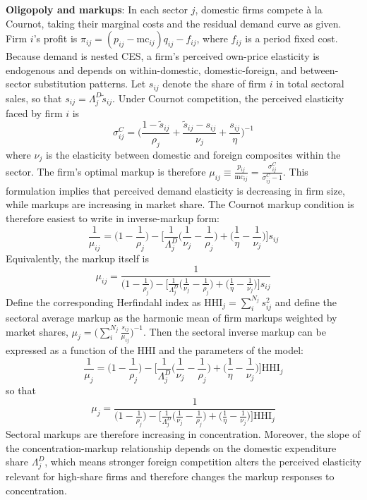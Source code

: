 \documentclass[12pt]{article}
\begin{document}
\textbf{Oligopoly and markups}: In each sector $j$, domestic firms compete à la Cournot, taking their marginal costs and the residual demand curve as given. Firm $i$'s profit is $\pi_{ij} = (p_{ij} - \text{mc}_{ij}) q_{ij} - f_{ij}$, where $f_{ij}$ is a period fixed cost. Because demand is nested CES, a firm's perceived own-price elasticity is endogenous and depends on within-domestic, domestic-foreign, and between-sector substitution patterns. Let $s_{ij}$ denote the share of firm $i$ in total sectoral sales, so that $s_{ij} = \Lambda^D_{j} \tilde{s}_{ij}$. Under Cournot competition, the perceived elasticity faced by firm $i$ is 
\[ \sigma^C_{ij} = \Bigg(\frac{1-\tilde{s}_{ij}}{\rho_j} + \frac{\tilde{s}_{ij} - s_{ij}}{\nu_j} + \frac{{s}_{ij}}{\eta} \Bigg)^{-1} \]
where $\nu_j$ is the elasticity between domestic and foreign composites within the sector. The firm's optimal markup is therefore $\mu_{ij} \equiv \frac{p_{ij}}{\text{mc}_{ij}} = \frac{\sigma^C_{ij}}{\sigma^C_{ij} - 1}$. This formulation implies that perceived demand elasticity is decreasing in firm size, while markups are increasing in market share. The Cournot markup condition is therefore easiest to write in inverse-markup form:
\begin{equation}
\frac{1}{\mu_{ij}} = \Bigg( 1- \frac{1}{\rho_j}\Bigg) - \Bigg[\frac{1}{\Lambda^D_{j}} \Bigg(\frac{1}{\nu_j} - \frac{1}{\rho_j}\Bigg) + \Bigg(\frac{1}{\eta} - \frac{1}{\nu_j} \Bigg) \Bigg] {s}_{ij}
\end{equation}
Equivalently, the markup itself is
\begin{equation}
\mu_{ij} = \frac{1}{\Big( 1- \frac{1}{\rho_j}\Big) - \Big[\frac{1}{\Lambda^D_{j}} \Big(\frac{1}{\nu_j} - \frac{1}{\rho_j}\Big) + \Big(\frac{1}{\eta} - \frac{1}{\nu_j} \Big) \Big] {s}_{ij}}
\end{equation}
Define the corresponding Herfindahl index as $\text{HHI}_j = \sum_i^{N_j} s^2_{ij}$ and define the sectoral average markup as the harmonic mean of firm markups weighted by market shares, $\mu_j = \bigg(\sum_i^{N_j} \frac{s_{ij}}{\mu_{ij}}\bigg)^{-1}$. Then the sectoral inverse markup can be expressed as a function of the HHI and the parameters of the model:
\begin{equation}
\frac{1}{\mu_j} = \Bigg( 1- \frac{1}{\rho_j}\Bigg) - \Bigg[\frac{1}{\Lambda^D_{j}} \Bigg( \frac{1}{\nu_j} - \frac{1}{\rho_j}\Bigg) + \Bigg(\frac{1}{\eta} - \frac{1}{\nu_j} \Bigg) \Bigg] \text{HHI}_j
\end{equation}
so that
\begin{equation}
\mu_j = \frac{1}{\Big( 1- \frac{1}{\rho_j}\Big) - \Big[\frac{1}{\Lambda^D_{j}} \Big( \frac{1}{\nu_j} - \frac{1}{\rho_j}\Big) + \Big(\frac{1}{\eta} - \frac{1}{\nu_j} \Big) \Big] \text{HHI}_j}
\end{equation}
Sectoral markups are therefore increasing in concentration. Moreover, the slope of the concentration-markup relationship depends on the domestic expenditure share $\Lambda^D_{j}$, which means stronger foreign competition alters the perceived elasticity relevant for high-share firms and therefore changes the markup responses to concentration.
\end{document}
